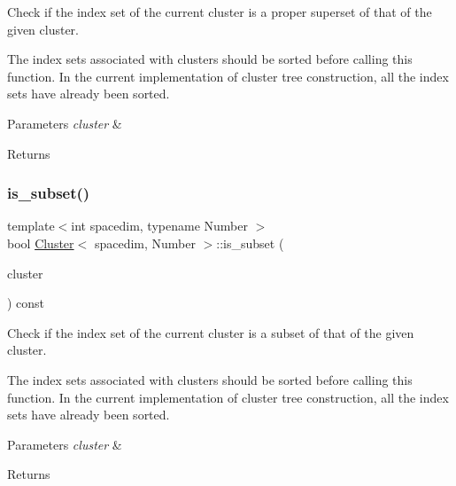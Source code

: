 Check if the index set of the current cluster is a proper superset of that of the given cluster.


\begin{DoxyDescription}
\item[Note ]The index sets associated with clusters should be sorted before calling this function. In the current implementation of cluster tree construction, all the index sets have already been sorted. 
\end{DoxyDescription}
\begin{DoxyParams}{Parameters}
{\em cluster} & \\
\hline
\end{DoxyParams}
\begin{DoxyReturn}{Returns}

\end{DoxyReturn}
\mbox{\label{classCluster_a8cbdd8366b60c14f44a951ebfe024bb5}} 
\subsubsection{\texorpdfstring{is\+\_\+subset()}{is\_subset()}}
{\footnotesize\ttfamily template$<$int spacedim, typename Number $>$ \\
bool \hyperlink{classCluster}{Cluster}$<$ spacedim, Number $>$\+::is\+\_\+subset (\begin{DoxyParamCaption}\item[{const \hyperlink{classCluster}{Cluster}$<$ spacedim, Number $>$ \&}]{cluster }\end{DoxyParamCaption}) const}

Check if the index set of the current cluster is a subset of that of the given cluster.


\begin{DoxyDescription}
\item[Note ]The index sets associated with clusters should be sorted before calling this function. In the current implementation of cluster tree construction, all the index sets have already been sorted. 
\end{DoxyDescription}
\begin{DoxyParams}{Parameters}
{\em cluster} & \\
\hline
\end{DoxyParams}
\begin{DoxyReturn}{Returns}

\end{DoxyReturn}
\mbox{\label{classCluster_abdc3b12ac53ba6fba8479a9bbd9b6aa2}} 
